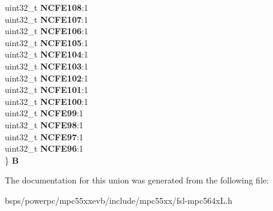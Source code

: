 \begin{DoxyCompactItemize}
\begin{tabbing}
\>uint32\_t {\bfseries NCFE108}:1\\
\>uint32\_t {\bfseries NCFE107}:1\\
\>uint32\_t {\bfseries NCFE106}:1\\
\>uint32\_t {\bfseries NCFE105}:1\\
\>uint32\_t {\bfseries NCFE104}:1\\
\>uint32\_t {\bfseries NCFE103}:1\\
\>uint32\_t {\bfseries NCFE102}:1\\
\>uint32\_t {\bfseries NCFE101}:1\\
\>uint32\_t {\bfseries NCFE100}:1\\
\>uint32\_t {\bfseries NCFE99}:1\\
\>uint32\_t {\bfseries NCFE98}:1\\
\>uint32\_t {\bfseries NCFE97}:1\\
\>uint32\_t {\bfseries NCFE96}:1\\
\} {\bfseries B}\\

\end{tabbing}\end{DoxyCompactItemize}


The documentation for this union was generated from the following file\+:\begin{DoxyCompactItemize}
\item 
bsps/powerpc/mpc55xxevb/include/mpc55xx/fsl-\/mpc564x\+L.\+h\end{DoxyCompactItemize}
